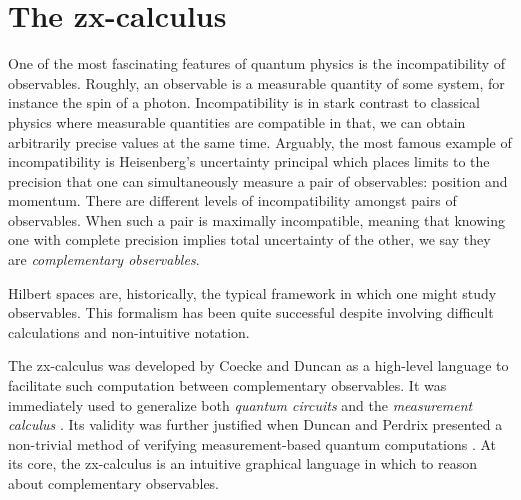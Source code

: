 \documentclass[./1--Catfying_zxCalc--Master.tex]{subfiles} %
\begin{document}


\section{The zx-calculus}
\label{sec:ZxCalc}

One of the most fascinating features 
of quantum physics is the 
incompatibility of observables. 
Roughly, an observable is a 
measurable quantity of some system, 
for instance the spin of a photon.  
Incompatibility is in stark contrast 
to classical physics where
measurable quantities are compatible
in that, we can obtain
arbitrarily precise values 
at the same time.   
Arguably, the most famous example 
of incompatibility is 
Heisenberg's uncertainty principal
which places limits to 
the precision that one 
can simultaneously measure a 
pair of observables: 
position and momentum.  
There are different levels of 
incompatibility amongst 
pairs of observables. 
When such a pair is 
maximally incompatible, 
meaning that 
knowing one with complete precision 
implies total uncertainty of the other, 
we say they are 
\emph{complementary observables}.  

Hilbert spaces are, historically, 
the typical framework 
in which one might 
study observables.  
This formalism has been
quite successful
despite involving difficult calculations
and non-intuitive notation. 

The zx-calculus was 
developed by Coecke and Duncan 
	\cite{CoeckeDuncan_QuantumObsFullPaper} 
as a high-level language 
to facilitate such computation
between complementary observables.  
It was immediately used to 
generalize both \emph{quantum circuits}
	\cite{NielsenChuang_QuantumCompInfo}  
and the \emph{measurement calculus}
	\cite{DanosKashefiPanang_MeasurementCalc}. 
Its validity was further justified 
when Duncan and Perdrix 
presented a non-trivial method 
of verifying measurement-based 
quantum computations
	\cite{DuncanPerdrix_RewritingQuantumCompu}.  
At its core, the zx-calculus is 
an intuitive graphical language 
in which to reason about 
complementary observables. 
\end{document}
